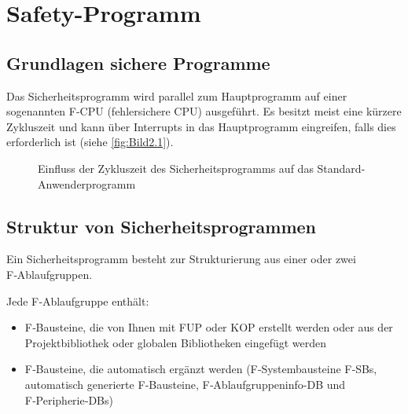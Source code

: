 \section{Safety-Programm}

\subsection{Grundlagen sichere Programme}

Das Sicherheitsprogramm wird parallel zum Hauptprogramm auf einer sogenannten F-CPU (fehlersichere CPU) ausgeführt. Es besitzt meist eine kürzere Zykluszeit und kann über Interrupts in das Hauptprogramm eingreifen, falls dies erforderlich ist (siehe \autoref{fig:Bild2.1}).

\begin{figure}[H]
   \centering
   \caption[Zykluszeit Sicherheitsprogramm]{Einfluss der Zykluszeit des Sicherheitsprogramms auf das Standard- Anwenderprogramm}
   \label{fig:Bild2.1}
\end{figure}

\subsection{Struktur von Sicherheitsprogrammen}

Ein Sicherheitsprogramm besteht zur Strukturierung aus einer oder zwei F‑Ablaufgruppen. 

Jede F‑Ablaufgruppe enthält:

\begin{itemize}
    \item F‑Bausteine, die von Ihnen mit FUP oder KOP erstellt werden oder aus der Projektbibliothek oder globalen Bibliotheken eingefügt werden
    \item F‑Bausteine, die automatisch ergänzt werden (F‑Systembausteine F‑SBs, automatisch generierte F‑Bausteine, F‑Ablaufgruppeninfo-DB und F‑Peripherie‑DBs)
\end{itemize}

